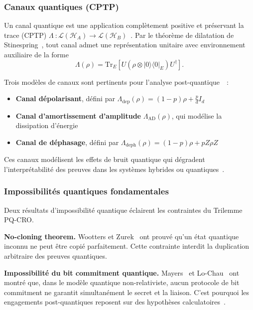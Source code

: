\begin{sloppypar}
\subsubsection{Canaux quantiques (CPTP)}
\label{subsubsec:canaux_quantiques}

Un canal quantique est une application compl\`etement positive et pr\'eservant
la trace (CPTP) $\Lambda~: \mathcal{L}(\mathcal{H}_A) \to \mathcal{L}(\mathcal{H}_B)$~\cite{NielsenChuang2010}.
Par le th\'eor\`eme de dilatation de Stinespring~\cite{Stinespring}, tout canal admet une repr\'esentation
unitaire avec environnement auxiliaire de la forme
\begin{equation}
\Lambda(\rho) = \mathrm{Tr}_E\left[U (\rho \otimes |0\rangle\langle 0|_E) U^\dagger\right].
\label{eq:stinespring}
\end{equation}

Trois mod\`eles de canaux sont pertinents pour l'analyse post-quantique~\cite{Wilde2017}~:
\begin{itemize}
\item \textbf{Canal d\'epolarisant}, d\'efini par $\Lambda_{\mathrm{dep}}(\rho) = (1-p)\rho + \frac{p}{d}I_d$
\item \textbf{Canal d'amortissement d'amplitude} $\Lambda_{\mathrm{AD}}(\rho)$, qui mod\'elise la dissipation d'\'energie
\item \textbf{Canal de d\'ephasage}, d\'efini par $\Lambda_{\mathrm{deph}}(\rho) = (1-p)\rho + p Z\rho Z$
\end{itemize}

Ces canaux mod\'elisent les effets de bruit quantique qui d\'egradent
l'interpr\'etabilit\'e des preuves dans les syst\`emes hybrides ou quantiques~\cite{Zurek2003,Wootters1982}.

\subsubsection{Impossibilit\'es quantiques fondamentales}
\label{subsubsec:impossibilites_quantiques}

Deux r\'esultats d'impossibilit\'e quantique \'eclairent les contraintes du Trilemme PQ-CRO.

\textbf{No-cloning theorem.} Wootters et Zurek~\cite{Wootters1982} ont prouv\'e qu'un \'etat quantique inconnu ne peut \^etre copi\'e parfaitement. Cette contrainte interdit la duplication arbitraire des preuves quantiques.

\textbf{Impossibilit\'e du bit commitment quantique.} Mayers~\cite{Mayers1997} et Lo-Chau~\cite{Lo1997} ont montr\'e que, dans le mod\`ele quantique non-relativiste, aucun protocole de bit commitment ne garantit simultan\'ement le secret et la liaison. C'est pourquoi les engagements post-quantiques reposent sur des hypoth\`eses calculatoires~\cite{Unruh2016}.
\end{sloppypar}

